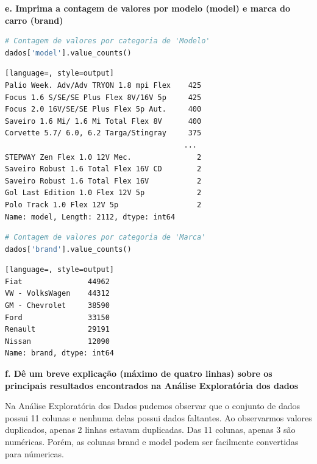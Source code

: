 \begin{adjustwidth}{1em}{}
\textbf{e. Imprima a contagem de valores por modelo (model) e marca do carro (brand)}
\end{adjustwidth}
\begin{lstlisting}[language=Python, style=input]
# Contagem de valores por categoria de 'Modelo'
dados['model'].value_counts()
\end{lstlisting}
\begin{lstlisting}[language=, style=output]
Palio Week. Adv/Adv TRYON 1.8 mpi Flex    425
Focus 1.6 S/SE/SE Plus Flex 8V/16V 5p     425
Focus 2.0 16V/SE/SE Plus Flex 5p Aut.     400
Saveiro 1.6 Mi/ 1.6 Mi Total Flex 8V      400
Corvette 5.7/ 6.0, 6.2 Targa/Stingray     375
                                         ... 
STEPWAY Zen Flex 1.0 12V Mec.               2
Saveiro Robust 1.6 Total Flex 16V CD        2
Saveiro Robust 1.6 Total Flex 16V           2
Gol Last Edition 1.0 Flex 12V 5p            2
Polo Track 1.0 Flex 12V 5p                  2
Name: model, Length: 2112, dtype: int64
\end{lstlisting}
\begin{lstlisting}[language=Python, style=input]
# Contagem de valores por categoria de 'Marca'
dados['brand'].value_counts()
\end{lstlisting}
\begin{lstlisting}[language=, style=output]
Fiat               44962
VW - VolksWagen    44312
GM - Chevrolet     38590
Ford               33150
Renault            29191
Nissan             12090
Name: brand, dtype: int64
\end{lstlisting}

\begin{adjustwidth}{1em}{}
\textbf{f. Dê um breve explicação (máximo de quatro linhas) sobre os principais resultados encontrados na Análise Exploratória dos dados}
\end{adjustwidth}
Na Análise Exploratória dos Dados pudemos observar que o conjunto de dados possui 11 colunas e nenhuma delas possui dados faltantes. Ao observarmos valores duplicados, apenas 2 linhas estavam duplicadas. Das 11 colunas, apenas 3 são numéricas. Porém, as colunas brand e model podem ser facilmente convertidas para númericas.


